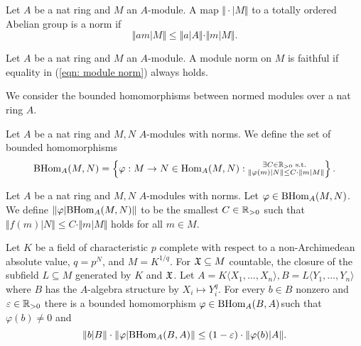 \begin{definition}\label{def: module norm}
    Let $A$ be a nat ring and $M$ an $A$-module. A map $\Vert\cdot|M\Vert$ to a totally ordered Abelian group is a norm if
    \begin{equation}\label{eqn: module norm}
        \Vert am|M\Vert\leq\Vert a|A\Vert\cdot\Vert m|M\Vert.
    \end{equation}
\end{definition}
\begin{definition}\label{def: faithful module norm}
    Let $A$ be a nat ring and $M$ an $A$-module. A module norm on $M$ is faithful if equality in (\ref{eqn: module norm}) always holds. 
\end{definition}
We consider the bounded homomorphisms between normed modules over a nat ring $A$. 
\begin{definition}\label{def: bounded module homomorphisms}
    Let $A$ be a nat ring and $M,N$ $A$-modules with norms. We define the set of bounded homomorphisms 
    \begin{equation}\label{eqn: def of BHom}
        \mathrm{BHom}_{A}(M,N)=\left\{\varphi:M\to N\in\mathrm{Hom}_{A}(M,N):\substack{\exists C\in\mathbb{R}_{>0}\text{ s.t. }\\ \Vert \varphi(m)|N\Vert\leq C\cdot\Vert m|M\Vert}\right\}.
    \end{equation}
\end{definition}
\begin{definition}\label{def: norm of Homomorphism}
    Let $A$ be a nat ring and $M,N$ $A$-modules with norms. Let $\varphi\in\mathrm{BHom}_{A}(M,N)$. We define $\Vert\varphi|\mathrm{BHom}_{A}(M,N)\Vert$ to be the smallest $C\in\mathbb{R}_{>0}$ such that $\Vert f(m)|N\Vert\leq C\cdot\Vert m|M\Vert$ holds for all $m\in M$. 
\end{definition}
\begin{lemma}\label{lem: p-power roots}
    Let $K$ be a field of characteristic $p$ complete with respect to a non-Archimedean absolute value, $q=p^{N}$, and $M=K^{1/q}$. For $\mathfrak{X}\subseteq M$ countable, the closure of the subfield $L\subseteq M$ generated by $K$ and $\mathfrak{X}$. Let $A=K\langle X_{1},\dots,X_{n}\rangle, B=L\langle Y_{1},\dots,Y_{n}\rangle$ where $B$ has the $A$-algebra structure by $X_{i}\mapsto Y_{i}^{q}$. For every $b\in B$ nonzero and $\varepsilon\in\mathbb{R}_{>0}$ there is a bounded homomorphism $\varphi\in\mathrm{BHom}_{A}(B,A)$such that $\varphi(b)\neq0$ and 
    $$\Vert b|B\Vert\cdot\Vert\varphi|\mathrm{BHom}_{A}(B,A)\Vert\leq(1-\varepsilon)\cdot\Vert\varphi(b)|A\Vert.$$
\end{lemma}
